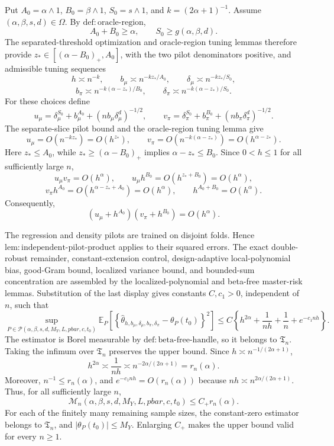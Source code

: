 Put \(A_0=\alpha\wedge1\), \(B_0=\beta\wedge1\), \(S_0=s\wedge1\), and \(k=(2\alpha+1)^{-1}\). Assume \((\alpha,\beta,s,d)\in\Omega\). By \(\mathrm{def:oracle\text{-}region}\),
\[
A_0+B_0\ge\alpha,
\qquad
S_0\ge g(\alpha,\beta,d).
\]
The separated-threshold optimization and oracle-region tuning lemmas therefore provide \(z_*\in[(\alpha-B_0)_+,A_0]\), with the two pilot denominators positive, and admissible tuning sequences
\[
h\asymp n^{-k},
\qquad
b_\mu\asymp n^{-kz_*/A_0},
\qquad
\delta_\mu\asymp n^{-kz_*/S_0},
\]
\[
b_\pi\asymp n^{-k(\alpha-z_*)/B_0},
\qquad
\delta_\pi\asymp n^{-k(\alpha-z_*)/S_0}.
\]
For these choices define
\[
u_\mu
=\delta_\mu^{S_0}+b_\mu^{A_0}
+(n b_\mu\delta_\mu^d)^{-1/2},
\qquad
v_\pi
=\delta_\pi^{S_0}+b_\pi^{B_0}
+(n b_\pi\delta_\pi^d)^{-1/2}.
\]
The separate-slice pilot bound and the oracle-region tuning lemma give
\[
u_\mu=O(n^{-kz_*})=O(h^{z_*}),
\qquad
v_\pi=O(n^{-k(\alpha-z_*)})=O(h^{\alpha-z_*}).
\]
Here \(z_*\le A_0\), while \(z_*\ge(\alpha-B_0)_+\) implies \(\alpha-z_*\le B_0\). Since \(0<h\le1\) for all sufficiently large \(n\),
\[
u_\mu v_\pi=O(h^\alpha),
\qquad
u_\mu h^{B_0}=O(h^{z_*+B_0})=O(h^\alpha),
\]
\[
v_\pi h^{A_0}=O(h^{\alpha-z_*+A_0})=O(h^\alpha),
\qquad
h^{A_0+B_0}=O(h^\alpha).
\]
Consequently,
\[
(u_\mu+h^{A_0})(v_\pi+h^{B_0})=O(h^\alpha).
\]

The regression and density pilots are trained on disjoint folds. Hence \(\mathrm{lem:independent\text{-}pilot\text{-}product}\) applies to their squared errors. The exact double-robust remainder, constant-extension control, design-adaptive local-polynomial bias, good-Gram bound, localized variance bound, and bounded-sum concentration are assembled by the localized-polynomial and beta-free master-risk lemmas. Substitution of the last display gives constants \(C,c_1>0\), independent of \(n\), such that
\[
\sup_{P\in\mathcal P(\alpha,\beta,s,d,M_Y,L,pbar,c,t_0)}
\mathbb E_P\!\left[
\left\{\widehat\theta_{h,b_\mu,\delta_\mu,b_\pi,\delta_\pi}
-\theta_P(t_0)\right\}^2
\right]
\le
C\left\{h^{2\alpha}+\frac1{nh}+\frac1n+e^{-c_1nh}\right\}.
\]
The estimator is Borel measurable by \(\mathrm{def:beta\text{-}free\text{-}handle}\), so it belongs to \(\mathfrak T_n\). Taking the infimum over \(\mathfrak T_n\) preserves the upper bound. Since \(h\asymp n^{-1/(2\alpha+1)}\),
\[
h^{2\alpha}\asymp\frac1{nh}
\asymp n^{-2\alpha/(2\alpha+1)}=r_n(\alpha).
\]
Moreover, \(n^{-1}\le r_n(\alpha)\), and \(e^{-c_1nh}=O(r_n(\alpha))\) because \(nh\asymp n^{2\alpha/(2\alpha+1)}\). Thus, for all sufficiently large \(n\),
\[
\mathcal M_n(\alpha,\beta,s,d,M_Y,L,pbar,c,t_0)
\le C_+r_n(\alpha).
\]
For each of the finitely many remaining sample sizes, the constant-zero estimator belongs to \(\mathfrak T_n\), and \(\lvert\theta_P(t_0)\rvert\le M_Y\). Enlarging \(C_+\) makes the upper bound valid for every \(n\ge1\).

